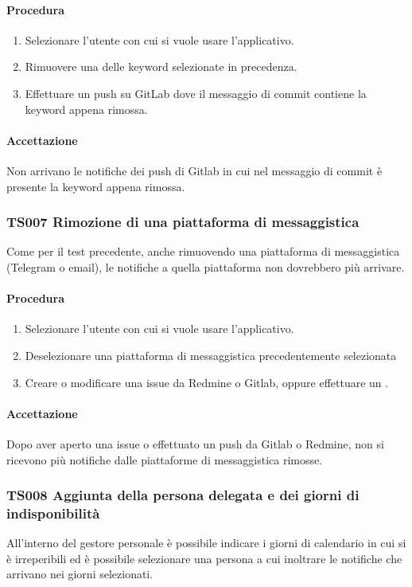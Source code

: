 		\paragraph*{Procedura}
			\begin{enumerate}
				\item Selezionare l'utente con cui si vuole usare l'applicativo.
				\item Rimuovere una delle keyword selezionate in precedenza.
				\item Effettuare un push su GitLab dove il messaggio di commit contiene la keyword appena rimossa.
			\end{enumerate}
		
		\paragraph*{Accettazione}
		Non arrivano le notifiche dei push di Gitlab in cui nel messaggio di commit è presente la keyword appena rimossa.
		
	\subsubsection{TS007 Rimozione di una piattaforma di messaggistica}
		Come per il test precedente, anche rimuovendo una piattaforma di messaggistica (Telegram o email), le notifiche a quella piattaforma non dovrebbero più arrivare.
		
		\paragraph*{Procedura}
		\begin{enumerate}
			\item Selezionare l'utente con cui si vuole usare l'applicativo.
			\item Deselezionare una piattaforma di messaggistica precedentemente selezionata
			\item Creare o modificare una issue da Redmine o Gitlab, oppure effettuare un . 
		\end{enumerate}
	
		\paragraph*{Accettazione}
		Dopo aver aperto una issue o effettuato un push da Gitlab o Redmine, non si ricevono più notifiche dalle piattaforme di messaggistica rimosse.
		
	\subsubsection{TS008 Aggiunta della persona delegata e dei giorni di indisponibilità}
		All'interno del gestore personale è possibile indicare i giorni di calendario in cui si è irreperibili ed è possibile selezionare una persona a cui inoltrare le notifiche che arrivano nei giorni selezionati.
		

